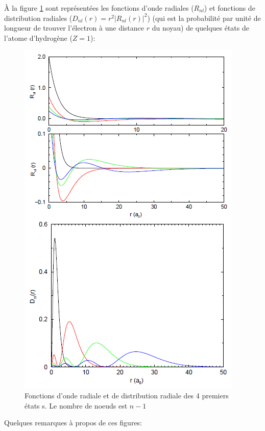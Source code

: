 À la figure \ref{fig:fcx_rad_1} sont représentées les fonctions d'onde radiales ($R_{nl}$) et fonctions de distribution radiales ($D_{nl}(r)=r^2|R_{nl}(r)|^2$) (qui est la probabilité par unité de longueur de trouver l'électron à une distance $r$ du noyau) de quelques états de l'atome d'hydrogène ($Z=1$):
\begin{figure}[htp]
    \centering
    \includegraphics[scale=0.8]{Images2/ex.PNG}
    \caption{Fonctions d'onde radiale et de distribution radiale des 4 premiers états s. Le nombre de noeuds est $n-1$}
    \label{fig:fcx_rad_1}
\end{figure}
Quelques remarques à propos de ces figures:

